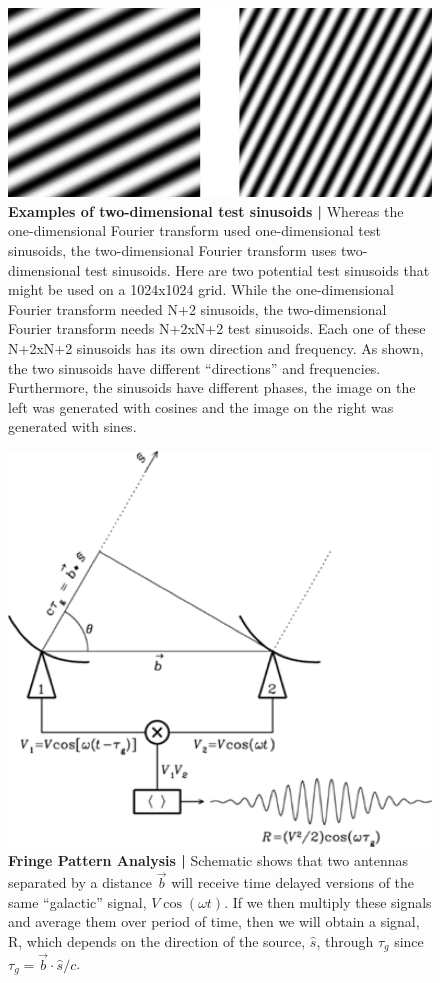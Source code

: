 \documentclass[12pt,a4paper]{article}
\begin{document}
\begin{figure}
\centering
\includegraphics[width=\textwidth]{_images/TwoTestSinusoids.png}
\caption{\textbf{ Examples of two-dimensional test sinusoids |} Whereas the one-dimensional Fourier transform used one-dimensional test sinusoids, the two-dimensional Fourier transform uses two-dimensional test sinusoids. Here are two potential test sinusoids that might be used on a 1024x1024 grid. While the one-dimensional Fourier transform needed N+2 sinusoids, the two-dimensional Fourier transform needs N+2xN+2 test sinusoids. Each one of these N+2xN+2 sinusoids has its own direction and frequency. As shown, the two sinusoids have different ``directions'' and frequencies. Furthermore, the sinusoids have different phases, the image on the left was generated with cosines and the image on the right was generated with sines.}
\end{figure}






\begin{figure}
\centering
\includegraphics[width=.8\textwidth]{_images/AntGeometry.png}
\caption{\textbf{Fringe Pattern Analysis |} Schematic shows that two antennas separated by a distance $\vec{b}$ will receive time delayed versions of the same ``galactic'' signal, $V\cos(\omega t)$. If we then multiply these signals and average them over period of time, then we will obtain a signal, R, which depends on the direction of the source, $\hat{s}$, through $\tau_g$ since $\tau_g = \vec{b} \cdot \hat{s} / c$.
}
\end{figure}
\end{document}
